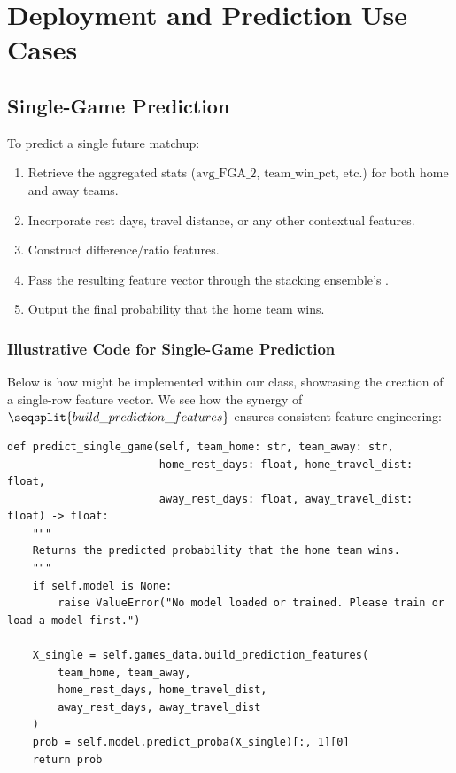 \documentclass[12pt]{article}
\begin{document}
\section{Deployment and Prediction Use Cases}

\subsection{Single-Game Prediction}
To predict a single future matchup:
\begin{enumerate}[label=\roman*)]
    \item Retrieve the aggregated stats (\(\text{avg\_FGA\_2}\), \(\text{team\_win\_pct}\), etc.) for both home and away teams.
    \item Incorporate rest days, travel distance, or any other contextual features.
    \item Construct difference/ratio features.
    \item Pass the resulting feature vector through the stacking ensemble’s .
    \item Output the final probability that the home team wins.
\end{enumerate}

\subsubsection{Illustrative Code for Single-Game Prediction}
Below is how  might be implemented within our  class, showcasing the creation of a single-row feature vector. We see how the synergy of \(\seqsplit{build\_prediction\_features}\) ensures consistent feature engineering:

\begin{verbatim}
def predict_single_game(self, team_home: str, team_away: str,
                        home_rest_days: float, home_travel_dist: float,
                        away_rest_days: float, away_travel_dist: float) -> float:
    """
    Returns the predicted probability that the home team wins.
    """
    if self.model is None:
        raise ValueError("No model loaded or trained. Please train or load a model first.")

    X_single = self.games_data.build_prediction_features(
        team_home, team_away,
        home_rest_days, home_travel_dist,
        away_rest_days, away_travel_dist
    )
    prob = self.model.predict_proba(X_single)[:, 1][0]
    return prob
\end{verbatim}
\end{document}
